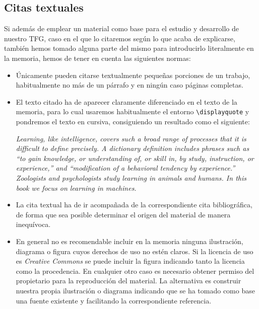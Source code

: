 \subsection{Citas textuales}

Si además de emplear un material como base para el estudio y desarrollo de nuestro TFG, caso en el que lo citaremos según lo que acaba de explicarse, también hemos tomado alguna parte del mismo para introducirlo literalmente en la memoria, hemos de tener en cuenta las siguientes normas:

\begin{itemize}
    \item Únicamente pueden citarse textualmente pequeñas porciones de un trabajo, habitualmente no más de un párrafo y en ningún caso páginas completas.
    
    \item El texto citado ha de aparecer claramente diferenciado en el texto de la memoria, para lo cual usaremos habitualmente el entorno \verb|\displayquote| y pondremos el texto en cursiva, consiguiendo un resultado como el siguiente:
    
    \begin{displayquote}
    \textit{Learning, like intelligence, covers such a broad range of processes that it is difficult to define precisely. A dictionary definition includes phrases such as “to gain knowledge, or understanding of, or skill in, by study, instruction, or experience,” and “modification of a behavioral tendency by experience.” Zoologists and psychologists study learning in animals and humans. In this book we focus on learning in machines.
    }\end{displayquote}
    
    \item La cita textual ha de ir acompañada de la correspondiente cita bibliográfica, de forma que sea posible determinar el origen del material de manera inequívoca.
    
    \item En general no es recomendable incluir en la memoria ninguna ilustración, diagrama o figura cuyos derechos de uso no estén claros. Si la licencia de uso es \textit{Creative Commons} se puede incluir la figura indicando tanto la licencia como la procedencia. En cualquier otro caso es necesario obtener permiso del propietario para la reproducción del material. La alternativa es construir nuestra propia ilustración o diagrama indicando que se ha tomado como base una fuente existente y facilitando la correspondiente referencia.
\end{itemize}

